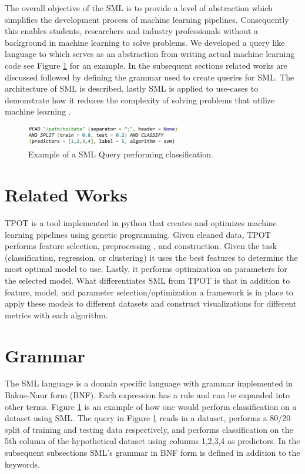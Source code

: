 \documentclass[jair,twoside,11pt,theapa]{article}
\begin{document}
The overall objective of the SML is to provide a level of abstraction which simplifies the development process of machine learning pipelines. Consequently this enables students, researchers and industry professionals without a background in machine learning to solve problems. We developed a query like language to which serves as an abstraction from writing actual machine learning code see Figure \ref{fig:sml-ex-1} for an example. In the subsequent sections related works are discussed followed by defining the grammar used to create queries for SML. The architecture of SML is described, lastly SML is applied to  use-cases to demonstrate how it reduces the complexity of solving problems that utilize machine learning .

\begin{figure}
\includegraphics[width=0.6\textwidth]{figs/sml-ex-1.png}
\centering
\caption{Example of a SML Query performing classification.}
\label{fig:sml-ex-1}
\end{figure}

\section{Related Works}
\label{RelatedWorks}

TPOT \cite{TPOT} is a tool implemented in python that creates and optimizes machine learning pipelines using genetic programming. Given cleaned data, TPOT performs feature selection, preprocessing , and construction. Given the task (classification, regression, or clustering) it uses the best features to determine the most optimal model to use. Lastly, it performs optimization on parameters for the selected model. What differentiates SML from TPOT is that in addition to feature, model, and parameter selection/optimization a framework is in place to apply these models to different datasets and construct visualizations for different metrics with each algorithm.

\section{Grammar}
\label{grammar}

The SML language is a domain specific language with grammar implemented in Bakus-Naur form (BNF). Each expression has a rule and can be expanded into other terms. Figure \ref{fig:sml-ex-1} is an example of how one would perform classification on a dataset using SML. The query in Figure \ref{fig:sml-ex-1} reads in a dataset, performs a 80/20 split of training and testing data respectively, and performs classification on the 5th column of the hypothetical dataset using columns 1,2,3,4 as predictors. In the subsequent subsections SML's grammar in BNF form is defined in addition to the keywords.
\end{document}
